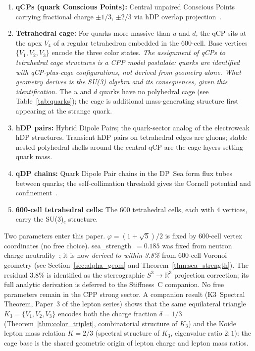 \documentclass[11pt,a4paper]{article}
\newcommand{\phig}{\varphi}
\begin{document}
\begin{enumerate}
\item \textbf{qCPs (quark Conscious Points):} Central unpaired
  Conscious Points carrying fractional charge $\pm 1/3$, $\pm 2/3$
  via hDP overlap projection~\citep{cpp5014}.
\item \textbf{Tetrahedral cage:} For quarks more massive than $u$ and $d$,
  the qCP sits at the apex $V_4$ of a regular tetrahedron embedded in
  the 600-cell.  Base vertices $\{V_1, V_2, V_3\}$ encode the three
  color states.  \textit{The assignment of qCPs to tetrahedral cage
  structures is a CPP model postulate: quarks are identified with
  qCP-plus-cage configurations, not derived from geometry alone.
  What geometry derives is the SU(3) algebra and its consequences,
  given this identification.}  The $u$ and $d$ quarks have no
  polyhedral cage (see Table~\ref{tab:quarks}); the cage is additional
  mass-generating structure first appearing at the strange quark.
\item \textbf{hDP pairs:} Hybrid Dipole Pairs; the quark-sector
  analog of the electroweak hDP structures.  Transient hDP pairs
  on tetrahedral edges are gluons; stable nested polyhedral shells
  around the central qCP are the cage layers setting quark mass.
\item \textbf{qDP chains:} Quark Dipole Pair chains in the DP~Sea
  form flux tubes between quarks; the self-collimation threshold
  gives the Cornell potential and confinement~\citep{c14}.
\item \textbf{600-cell tetrahedral cells:} The 600 tetrahedral
  cells, each with 4 vertices, carry the SU(3)$_c$ structure.
\end{enumerate}

Two parameters enter this paper.  $\phig = (1+\sqrt5)/2$ is fixed by
600-cell vertex coordinates (no free choice).  sea\_strength~$= 0.185$
was fixed from neutron charge neutrality~\citep{cpp5014}; it is now
\emph{derived to within 3.8\%} from 600-cell Voronoi geometry (see
Section~\ref{sec:alpha_geom} and Theorem~\ref{thm:sea_strength}).
The residual 3.8\% is identified as the stereographic $S^3\to\mathbb{R}^3$
projection correction; its full analytic derivation is deferred to
the Stiffness~C companion.
No free parameters remain in the CPP strong sector.
A companion result (K3~Spectral Theorem, Paper~3 of the lepton series)
shows that the same equilateral triangle $K_3 = \{V_1,V_2,V_3\}$
encodes both the charge fraction $\delta = 1/3$ (Theorem~\ref{thm:color_triplet},
combinatorial structure of $K_3$) and the Koide lepton mass relation
$K = 2/3$ (spectral structure of $K_3$, eigenvalue ratio $2{:}1$):
the cage base is the shared geometric origin of lepton charge and
lepton mass ratios.
\end{document}
